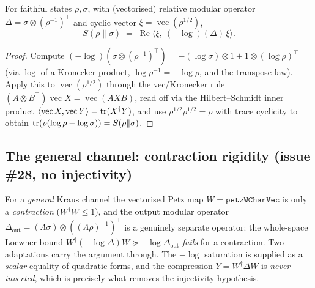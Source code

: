 \begin{lemma}\label{kronForm_re_eq_relEntropy}
  \leanok
  For faithful states \(\rho,\sigma\), with (vectorised) relative modular operator
  \(\Delta=\sigma\otimes(\rho^{-1})^{\top}\) and cyclic vector
  \(\xi=\operatorname{vec}(\rho^{1/2})\),
  \[
    S(\rho\|\sigma) \;=\; \operatorname{Re}\bigl\langle\xi,\ (-\log)(\Delta)\,\xi\bigr\rangle .
  \]
\end{lemma}
\begin{proof}\leanok
  Compute \((-\log)(\sigma\otimes(\rho^{-1})^{\top})=-(\log\sigma)\otimes 1+1\otimes(\log\rho)^{\top}\)
  (via \(\log\) of a Kronecker product, \(\log\rho^{-1}=-\log\rho\), and the transpose law). Apply
  this to \(\operatorname{vec}(\rho^{1/2})\) through the vec/Kronecker rule
  \((A\otimes B^{\top})\operatorname{vec}X=\operatorname{vec}(AXB)\), read off via the
  Hilbert--Schmidt inner product \(\langle\operatorname{vec}X,\operatorname{vec}Y\rangle=\operatorname{tr}(X^{\dagger}Y)\),
  and use \(\rho^{1/2}\rho^{1/2}=\rho\) with trace cyclicity to obtain
  \(\operatorname{tr}(\rho(\log\rho-\log\sigma))=S(\rho\|\sigma)\).
\end{proof}

\subsection{The general channel: contraction rigidity (issue \#28, no injectivity)}

For a \emph{general} Kraus channel the vectorised Petz map \(W=\texttt{petzWChanVec}\) is only a
\emph{contraction} (\(W^{\dagger}W\le 1\)), and the output modular operator
\(\Delta_{\mathrm{out}}=(\Lambda\sigma)\otimes((\Lambda\rho)^{-1})^{\top}\) is a genuinely separate
operator: the whole-space Loewner bound \(W^{\dagger}(-\log\Delta)W\succeq-\log\Delta_{\mathrm{out}}\)
\emph{fails} for a contraction. Two adaptations carry the argument through. The \(-\log\) saturation
is supplied as a \emph{scalar} equality of quadratic forms, and the compression
\(Y=W^{\dagger}\Delta W\) is \emph{never inverted}, which is precisely what removes the injectivity
hypothesis.

